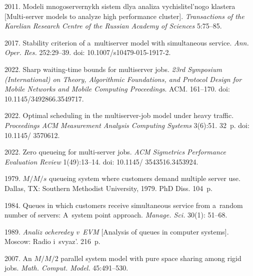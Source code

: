   \begin{multicols}{2}

\renewcommand{\bibname}{\protect\rmfamily References}

{\small\frenchspacing
 {%
 \begin{thebibliography}{99} 
 2011. Modeli mnogoservernykh sistem dlya analiza vychislitel'nogo 
klastera [Multi-server models to analyze high performance cluster]. \textit{Transactions of the Karelian Research Centre of the
Russian Academy of Sciences} 5:75--85.  


 2017. Stability criterion of a~multiserver model with simultaneous service. 
\textit{Ann. Oper. Res.} 252:29--39. doi: 10.1007/s10479-015-1917-2.

 2022. Sharp waiting-time bounds for multiserver jobs. 
\textit{23rd  Symposium (International) on Theory, Algorithmic Foundations, and Protocol Design for Mobile Networks and Mobile Computing
Proceedings}. ACM. 161--170. doi: 10.1145/3492866.3549717.

 2022. Optimal scheduling in the multiserver-job model under heavy traffic.
 \textit{Proceedings ACM Measurement Analysis Computing Systems} 3(6):51. 32~p. doi: 10.1145/ 3570612.

 2022. Zero queueing for multi-server jobs.
\textit{ACM Sigmetrics Performance Evaluation Review} 1(49):13--14. doi: 10.1145/ 3543516.3453924.

 1979. ${M/M/s}$ queueing system where customers demand multiple server use.
 Dallas, TX: Southern Methodist University, 1979. PhD Diss. 104~p.

 1984. Queues in which customers receive simultaneous service from a~random number of 
 servers: A~system point approach. \textit{Manage. Sci.}  30(1): 51--68.



 1989.
\textit{Analiz ocheredey v~EVM} [Analysis of queues in computer systems]. Moscow: Radio i~svyaz'. 216~p.

 2007. An ${M/M/2}$ parallel system model with pure
space sharing among rigid jobs.
\textit{Math. Comput. Model.} 45:491--530.


\end{thebibliography}}}
\end{multicols}
